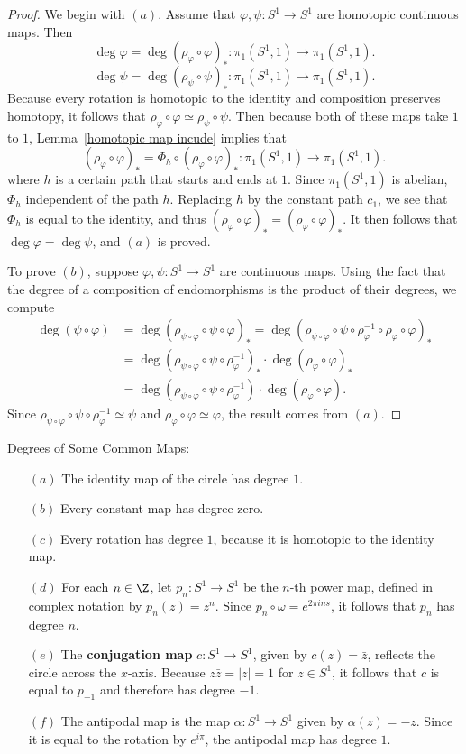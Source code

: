 \begin{proof}
We begin with $(a)$. Assume that $\varphi,\psi:S^1\to S^1$ are homotopic continuous maps. Then
\[\deg\varphi=\deg(\rho_\varphi\circ\varphi)_*:\pi_1(S^1,1)\to\pi_1(S^1,1).\]
\[\deg\psi=\deg(\rho_\psi\circ\psi)_*:\pi_1(S^1,1)\to\pi_1(S^1,1).\]
Because every rotation is homotopic to the identity and composition preserves homotopy, it follows that $\rho_\varphi\circ\varphi\simeq\rho_\psi\circ\psi$. Then because both of these maps take $1$ to $1$, Lemma~\ref{homotopic map incude} implies that
\[(\rho_\varphi\circ\varphi)_*=\varPhi_h\circ(\rho_\varphi\circ\varphi)_*:\pi_1(S^1,1)\to\pi_1(S^1,1).\]
where $h$ is a certain path that starts and ends at $1$. Since $\pi_1(S^1,1)$ is abelian, $\varPhi_h$ independent of the path $h$. Replacing $h$ by the constant path $c_1$, we see that $\varPhi_h$ is equal to the identity, and thus $(\rho_\varphi\circ\varphi)_*=(\rho_\varphi\circ\varphi)_*$. It then follows that $\deg\varphi=\deg\psi$, and $(a)$ is proved.\par
To prove $(b)$, suppose $\varphi,\psi:S^1\to S^1$ are continuous maps. Using the fact that the degree of a composition of endomorphisms is the product of their degrees, we compute
\begin{align*}
\deg(\psi\circ\varphi)&=\deg(\rho_{\psi\circ\varphi}\circ\psi\circ\varphi)_*=\deg(\rho_{\psi\circ\varphi}\circ\psi\circ\rho_{\varphi}^{-1}\circ\rho_\varphi\circ\varphi)_*\\
&=\deg(\rho_{\psi\circ\varphi}\circ\psi\circ\rho_{\varphi}^{-1})_*\cdot\deg(\rho_\varphi\circ\varphi)_*\\
&=\deg(\rho_{\psi\circ\varphi}\circ\psi\circ\rho_{\varphi}^{-1})\cdot\deg(\rho_\varphi\circ\varphi).
\end{align*}
Since $\rho_{\psi\circ\varphi}\circ\psi\circ\rho_{\varphi}^{-1}\simeq\psi$ and $\rho_\varphi\circ\varphi\simeq\varphi$, the result comes from $(a)$.
\end{proof}
\begin{example}\label{degree eg}
Degrees of Some Common Maps:
\begin{itemize}
\item[$(a)$] The identity map of the circle has degree $1$.
\item[$(b)$] Every constant map has degree zero.
\item[$(c)$] Every rotation has degree $1$, because it is homotopic to the identity map.
\item[$(d)$] For each $n\in\Z$, let $p_n:S^1\to S^1$ be the $n$-th power map, defined in complex notation by $p_n(z)=z^n$. Since $p_n\circ\omega=e^{2\pi ins}$, it follows that $p_n$ has degree $n$.
\item[$(e)$] The \textbf{conjugation map} $c:S^1\to S^1$, given by $c(z)=\bar{z}$, reflects the circle across the $x$-axis. Because $z\bar{z}=|z|=1$ for $z\in S^1$, it follows that $c$ is equal to $p_{-1}$ and
therefore has degree $-1$.
\item[$(f)$] The antipodal map is the map $\alpha:S^1\to S^1$ given by $\alpha(z)=-z$. Since it is equal to the rotation by $e^{i\pi}$, the antipodal map has degree $1$.
\end{itemize}
\end{example}
